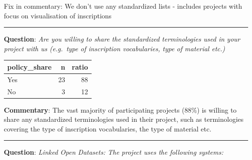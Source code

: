 \documentclass[
  12pt,
]{scrreprt}
\begin{document}
Fix in commentary: We don't use any standardized lists - includes
projects with focus on visualisation of inscriptions

\begin{center}\rule{0.5\linewidth}{0.5pt}\end{center}

\textbf{Question}: \emph{Are you willing to share the standardized
terminologies used in your project with us (e.g.~type of inscription
vocabularies, type of material etc.)}

\begin{longtable}[]{@{}lrr@{}}
\toprule
policy\_share & n & ratio \\
\midrule
\endhead
Yes & 23 & 88 \\
No & 3 & 12 \\
\bottomrule
\end{longtable}

\textbf{Commentary}: The vast majority of participating projects (88\%)
is willing to share any standardized terminologies used in their
project, such as terminologies covering the type of inscription
vocabularies, the type of material etc.

\begin{center}\rule{0.5\linewidth}{0.5pt}\end{center}

\textbf{Question}: \emph{Linked Open Datasets: The project uses the
following systems:}
\end{document}
